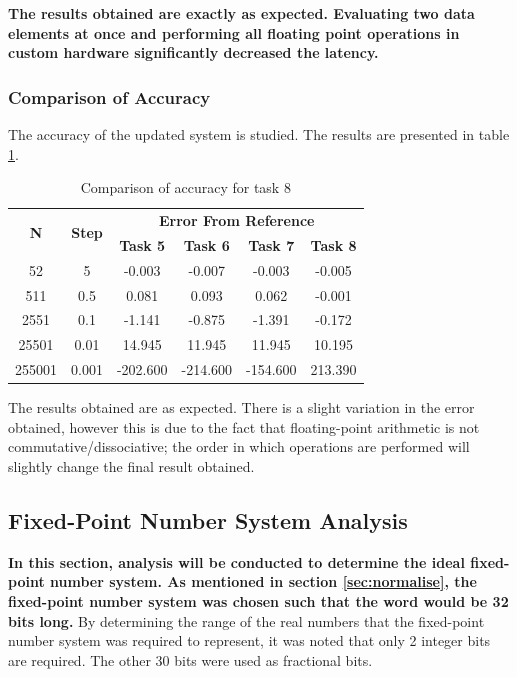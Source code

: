 \documentclass{article}
\begin{document}
\textbf{The results obtained are exactly as expected. Evaluating two data elements at once and performing all floating point operations in custom hardware significantly decreased the latency.}

\subsubsection{Comparison of Accuracy}
The accuracy of the updated system is studied. The results are presented in table \ref{tab:task8_accuracy}.

\begin{table}[H]
  \centering
    \begin{tabular}{|c|c|c|c|c|c|}
    \hline
    \multirow{2}[4]{*}{\textbf{N}} & \multirow{2}[4]{*}{\textbf{Step}} & \multicolumn{4}{c|}{\textbf{Error From Reference}} \\
\cline{3-6}          &       & \textbf{Task 5} & \textbf{Task 6} & \textbf{Task 7} & \textbf{Task 8} \\
    \hline
    52    & 5     & -0.003 & -0.007 & -0.003 & -0.005 \\
    \hline
    511   & 0.5   & 0.081 & 0.093 & 0.062 & -0.001 \\
    \hline
    2551  & 0.1   & -1.141 & -0.875 & -1.391 & -0.172 \\
    \hline
    25501 & 0.01  & 14.945 & 11.945 & 11.945 & 10.195 \\
    \hline
    255001 & 0.001 & -202.600 & -214.600 & -154.600 & 213.390\\
    \hline
    \end{tabular}%
  \caption{Comparison of accuracy for task 8}
  \label{tab:task8_accuracy}%
\end{table}%

The results obtained are as expected. There is a slight variation in the error obtained, however this is due to the fact that floating-point arithmetic is not commutative/dissociative; the order in which operations are performed will slightly change the final result obtained.

\subsection{Fixed-Point Number System Analysis}\label{sec:fixed_point_num_analysis}

\textbf{In this section, analysis will be conducted to determine the ideal fixed-point number system. As mentioned in section \ref{sec:normalise}, the fixed-point number system was chosen such that the word would be 32 bits long.} By determining the range of the real numbers that the fixed-point number system was required to represent, it was noted that only 2 integer bits are required. The other 30 bits were used as fractional bits.\\ 
\end{document}
